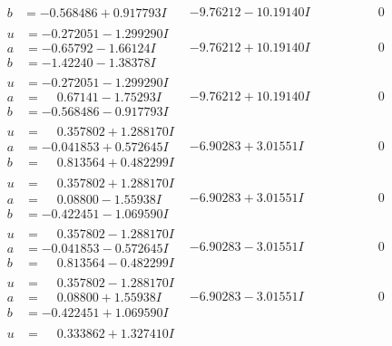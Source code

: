 \documentclass[1p]{elsarticle_modified}
\theoremstyle{definition}
\begin{document}
$$\begin{array}{c|c|c}
\begin{aligned}
b &= -0.568486 + 0.917793 I\end{aligned}
 & -9.76212 - 10.19140 I & \phantom{-0.000000 } 0 \\ \hline\begin{aligned}
u &= -0.272051 - 1.299290 I \\
a &= -0.65792 - 1.66124 I \\
b &= -1.42240 - 1.38378 I\end{aligned}
 & -9.76212 + 10.19140 I & \phantom{-0.000000 } 0 \\ \hline\begin{aligned}
u &= -0.272051 - 1.299290 I \\
a &= \phantom{-}0.67141 - 1.75293 I \\
b &= -0.568486 - 0.917793 I\end{aligned}
 & -9.76212 + 10.19140 I & \phantom{-0.000000 } 0 \\ \hline\begin{aligned}
u &= \phantom{-}0.357802 + 1.288170 I \\
a &= -0.041853 + 0.572645 I \\
b &= \phantom{-}0.813564 + 0.482299 I\end{aligned}
 & -6.90283 + 3.01551 I & \phantom{-0.000000 } 0 \\ \hline\begin{aligned}
u &= \phantom{-}0.357802 + 1.288170 I \\
a &= \phantom{-}0.08800 - 1.55938 I \\
b &= -0.422451 - 1.069590 I\end{aligned}
 & -6.90283 + 3.01551 I & \phantom{-0.000000 } 0 \\ \hline\begin{aligned}
u &= \phantom{-}0.357802 - 1.288170 I \\
a &= -0.041853 - 0.572645 I \\
b &= \phantom{-}0.813564 - 0.482299 I\end{aligned}
 & -6.90283 - 3.01551 I & \phantom{-0.000000 } 0 \\ \hline\begin{aligned}
u &= \phantom{-}0.357802 - 1.288170 I \\
a &= \phantom{-}0.08800 + 1.55938 I \\
b &= -0.422451 + 1.069590 I\end{aligned}
 & -6.90283 - 3.01551 I & \phantom{-0.000000 } 0 \\ \hline\begin{aligned}
u &= \phantom{-}0.333862 + 1.327410 I \\

\end{aligned}
\end{array}$$
\end{document}
